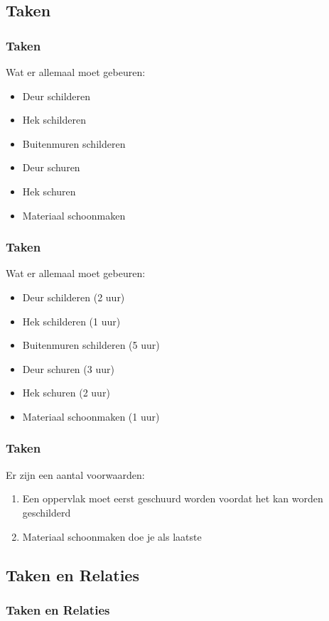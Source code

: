 \documentclass{beamer}
\theoremstyle{definition}
\newcommand{\inputtikz}[1]{}
\begin{document}
\subsection{Taken}
\begin{frame}
    \frametitle{Taken}
    Wat er allemaal moet gebeuren:
     \begin{itemize}
    	\item Deur schilderen
	\item Hek schilderen
	\item Buitenmuren schilderen
	\item<2-> Deur schuren
	\item<2-> Hek schuren
	\item<3-> Materiaal schoonmaken
    \end{itemize}
\end{frame}

\begin{frame}
    \frametitle{Taken}
    Wat er allemaal moet gebeuren:
     \begin{itemize}
    	\item Deur schilderen (2 uur)
	\item Hek schilderen (1 uur)
	\item Buitenmuren schilderen (5 uur)
	\item Deur schuren (3 uur)
	\item Hek schuren (2 uur)
	\item Materiaal schoonmaken (1 uur)
    \end{itemize}
\end{frame}

\begin{frame}
    	\frametitle{Taken}
   	Er zijn een aantal voorwaarden:
	\begin{enumerate}
	    	\item Een oppervlak moet eerst geschuurd worden voordat het kan worden geschilderd
		\item Materiaal schoonmaken doe je als laatste
	\end{enumerate}
\end{frame}

\subsection{Taken en Relaties}
\begin{frame}
	\frametitle{Taken en Relaties}
	\vspace{-1em}
	\begin{figure}[ht]
		\makebox[\textwidth][c]{\resizebox{.8\paperwidth}{!}{
			\inputtikz{precendence_graph}
		}}
		\vspace{-1em}
	\end{figure}
\end{frame}
\end{document}
